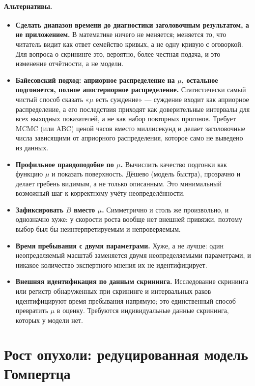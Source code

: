 \documentclass[12pt,a4paper]{article}
\newcommand{\alt}[1]{\paragraph{Альтернативы.} #1}
\begin{document}
\alt{\begin{itemize}[nosep]
  \item \textbf{Сделать диапазон времени до диагностики заголовочным результатом, а не приложением.} В
        математике ничего не меняется; меняется то, что читатель видит как ответ семейство кривых, а не одну
        кривую с оговоркой. Для вопроса о скрининге это, вероятно, более честная подача, и это изменение
        отчётности, а не модели.
  \item \textbf{Байесовский подход: априорное распределение на $\mu$, остальное подгоняется, полное
        апостериорное распределение.} Статистически самый чистый способ сказать «$\mu$ есть суждение» ---
        суждение входит как априорное распределение, а его последствия приходят как доверительные интервалы
        для всех выходных показателей, а не как набор повторных прогонов. Требует MCMC (или ABC) ценой часов
        вместо миллисекунд и делает заголовочные числа зависящими от априорного распределения, которое само
        не выведено из данных.
  \item \textbf{Профильное правдоподобие по $\mu$.} Вычислить качество подгонки как функцию $\mu$ и показать
        поверхность. Дёшево (модель быстра), прозрачно и делает гребень видимым, а не только описанным. Это
        минимальный возможный шаг к корректному учёту неопределённости.
  \item \textbf{Зафиксировать $B$ вместо $\mu$.} Симметрично и столь же произвольно, и однозначно хуже: у
        скорости роста вообще нет внешней привязки, поэтому выбор был бы неинтерпретируемым и
        непроверяемым.
  \item \textbf{Время пребывания с двумя параметрами.} Хуже, а не лучше: один неопределяемый масштаб
        заменяется двумя неопределяемыми параметрами, и никакое количество экспертного мнения их не
        идентифицирует.
  \item \textbf{Внешняя идентификация по данным скрининга.} Исследование скрининга или регистр обнаруженных
        при скрининге и интервальных раков идентифицируют время пребывания напрямую; это единственный способ
        превратить $\mu$ в оценку. Требуются индивидуальные данные скрининга, которых у модели нет.
\end{itemize}}

\section{Рост опухоли: редуцированная модель Гомпертца}
\label{sec:gompertz}
\end{document}
